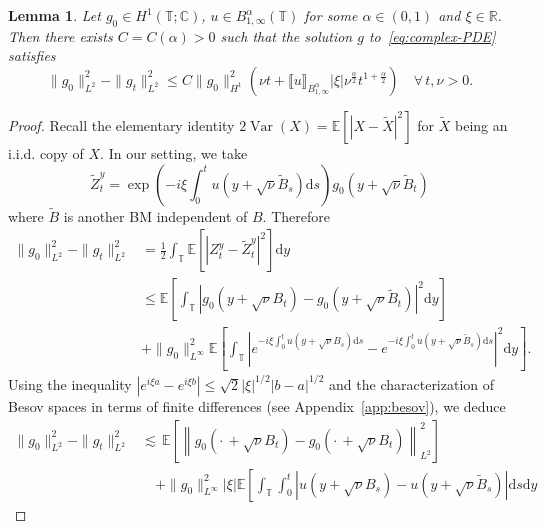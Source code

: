 \documentclass[11pt,oneside,reqno]{amsart}
\newcommand{\mathd}{\mathrm{d}}
\newcommand{\tmop}[1]{\ensuremath{\operatorname{#1}}}
\newtheorem{lemma}[theorem]{Lemma}
\numberwithin{equation}{section}
\begin{document}
\begin{lemma}
  \label{lem:lower-bound-enhanced-1}Let $g_0 \in H^1 (\mathbb{T};
  \mathbb{C})$, $u \in B^{\alpha}_{1, \infty} (\mathbb{T})$ for some $\alpha
  \in (0, 1)$ and $\xi \in \mathbb{R}$. Then there exists $C = C (\alpha) > 0$
  such that the solution $g$ to~\eqref{eq:complex-PDE} satisfies
  \[ \| g_0 \|_{L^2}^2 - \| g_t \|_{L^2}^2 \leqslant C \| g_0 \|^2_{H^1}
     \left( \nu t + \llbracket u \rrbracket_{B^{\alpha}_{1, \infty}} | \xi |
     \nu^{\frac{\alpha}{2}} t^{1 + \frac{\alpha}{2}} \right) \quad \forall \,
     t, \nu > 0. \]
\end{lemma}

\begin{proof}
  Recall the elementary identity $2 \tmop{Var} (X) =\mathbb{E} [| X -
  \tilde{X} |^2]$ for $\tilde{X}$ being an i.i.d. copy of $X$. In our setting,
  we take
  \[ \tilde{Z}^y_t = \exp \left( - i \xi \int_0^t u \left( y + \sqrt{\nu}
     \tilde{B}_s \right) \mathd s \right) g_0 \left( y + \sqrt{\nu}
     \tilde{B}_t \right) \]
  where $\tilde{B}$ is another BM independent of $B$. Therefore
%  
  \begin{align*}
    \| g_0 \|_{L^2}^2 - \| g_t \|_{L^2}^2 & = \frac{1}{2} 
    \int_{\mathbb{T}} \mathbb{E} [| Z^y_t - \tilde{Z}^y_t |^2] \mathd y\\
    & \leqslant \mathbb{E} \left[ \int_{\mathbb{T}} \left| g_0 \left( y +
    \sqrt{\nu} B_t \right) - g_0 \left( y + \sqrt{\nu} \tilde{B}_t \right)
    \right|^2 \mathd y \right]\\
    & + \| g_0 \|^2_{L^{\infty}} \mathbb{E} \left[ \int_{\mathbb{T}} \left|
    e^{- i \xi \int_0^t u \left( y + \sqrt{\nu} B_s \right) \mathd s} - e^{- i
    \xi \int_0^t u \left( y + \sqrt{\nu} \tilde{B}_s \right) \mathd s}
    \right|^2 \mathd y \right] .
  \end{align*}
%  
  Using the inequality $| e^{i \xi a} - e^{i \xi b} | \leqslant \sqrt{2}  |
  \xi |^{1 / 2} | b - a |^{1 / 2}$ and the characterization of Besov spaces in
  terms of finite differences (see Appendix~\ref{app:besov}), we deduce
%  
  \begin{align*}
    \| g_0 \|_{L^2}^2 - \| g_t \|_{L^2}^2 & \lesssim \, \mathbb{E} \left[
    \left\| g_0 \left( \cdot \, + \sqrt{\nu} B_t \right) - g_0 \left( \cdot \,
    + \sqrt{\nu} B_t \right) \right\|_{L^2}^2 \right] \\
    & \quad + \| g_0 \|_{L^{\infty}}^2  | \xi | \mathbb{E} \left[
    \int_{\mathbb{T}} \int_0^t \left| u \left( y + \sqrt{\nu} B_s \right) - u
    \left( y + \sqrt{\nu} \tilde{B}_s \right) \right| \mathd s \mathd y

\end{align*}
\end{proof}
\end{document}
